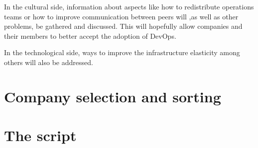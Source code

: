         In the cultural side, information about aspects like how to redistribute operations teams or how to improve communication between peers will ,as well as other problems, be gathered and discussed. This will hopefully allow companies and their members to better accept the adoption of DevOps.

        In the technological side, ways to improve the infrastructure elasticity among others will also be addressed.
    \section{Company selection and sorting}
    \section{The script}
